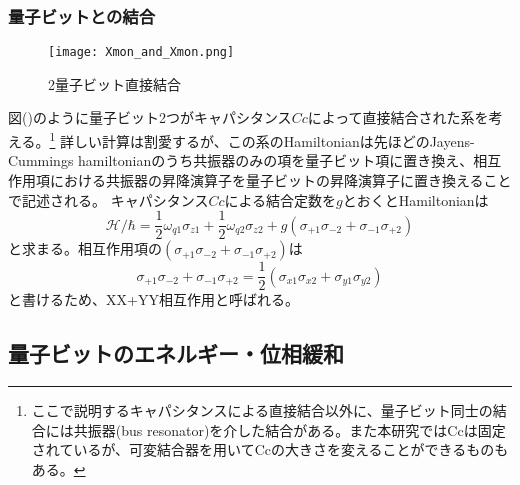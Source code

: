         \subsubsection{量子ビットとの結合}
        \begin{figure}[H]
            \begin{center}
                \texttt{[image: Xmon\_and\_Xmon.png]}
                \caption{2量子ビット直接結合}
            \end{center}
        \end{figure}
        図()のように量子ビット2つがキャパシタンス$Cc$によって直接結合された系を考える。\footnote{ここで説明するキャパシタンスによる直接結合以外に、量子ビット同士の結合には共振器(bus resonator)を介した結合がある。また本研究ではCcは固定されているが、可変結合器を用いてCcの大きさを変えることができるものもある。}
        詳しい計算は割愛するが、この系のHamiltonianは先ほどのJayens-Cummings hamiltonianのうち共振器のみの項を量子ビット項に置き換え、相互作用項における共振器の昇降演算子を量子ビットの昇降演算子に置き換えることで記述される。
        キャパシタンス$Cc$による結合定数を$g$とおくとHamiltonianは
        \begin{equation}
            \mathcal{H}/\hbar = \frac{1}{2} \omega_{q1} \sigma_{z1} +\frac{1}{2} \omega_{q2} \sigma_{z2} + g(\sigma_{+1}\sigma_{-2} + \sigma_{-1}\sigma_{+2})
        \end{equation}
        と求まる。相互作用項の$(\sigma_{+1}\sigma_{-2} + \sigma_{-1}\sigma_{+2})$は
        \begin{equation}
            \sigma_{+1}\sigma_{-2} + \sigma_{-1}\sigma_{+2} = \frac{1}{2}(\sigma_{x1}\sigma_{x2} + \sigma_{y1}\sigma_{y2})
        \end{equation}
        と書けるため、XX+YY相互作用と呼ばれる。

    \subsection{量子ビットのエネルギー・位相緩和}

